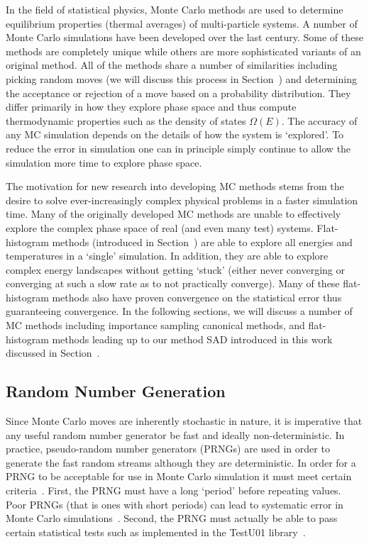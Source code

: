 In the field of statistical physics, Monte Carlo methods are used to determine equilibrium 
properties (thermal averages) of multi-particle systems.  A number of Monte Carlo simulations 
have been developed over the last century. Some of these methods are completely unique while 
others are more sophisticated variants of an original method. All of the methods share a number 
of similarities including picking random moves (we will discuss this process in Section~) and determining the acceptance or rejection of a 
move based on a probability distribution. They differ primarily in how they explore phase space 
and thus compute thermodynamic properties such as the density of states $\Omega(E)$. The accuracy of any MC simulation depends on the details of how the system is `explored'. To reduce the error 
in simulation one can in principle simply continue to allow the simulation more time to explore 
phase space.

The motivation for new research into developing MC methods stems from the desire to solve ever-increasingly complex physical problems in a faster simulation time. Many of the originally developed MC methods are unable to effectively explore the complex phase space of real (and even many test) systems. Flat-histogram methods (introduced in Section~) are able to explore all energies and temperatures in a `single' simulation. In addition, they are able to explore complex energy landscapes without getting `stuck' (either never converging or converging at such a slow rate as to not practically converge). Many of these flat-histogram methods also have proven convergence on the statistical error thus guaranteeing convergence.
In the following sections, we will discuss a number of MC methods including importance sampling canonical methods, and flat-histogram methods leading up to our method SAD introduced in this work discussed in Section~.

\subsection{Random Number Generation}\label{rng}

Since Monte Carlo moves are inherently stochastic in nature, it is imperative that any useful random number generator be fast and ideally non-deterministic. In practice, pseudo-random number generators (PRNGs) are used in order to generate the fast random streams although they are deterministic. In order for a PRNG to be acceptable for use in Monte Carlo simulation it must meet certain criteria~\cite{sawilowsky2003you}. First, the PRNG must have a long `period' before repeating values. Poor PRNGs (that is ones with short periods) can lead to systematic error in Monte Carlo simulations~\cite{ferrenberg1992monte, plascak2002cluster, ossola2004systematic}.
Second, the PRNG must actually be able to pass certain statistical tests such as implemented in the TestU01 library~\cite{l2007testu01}.

